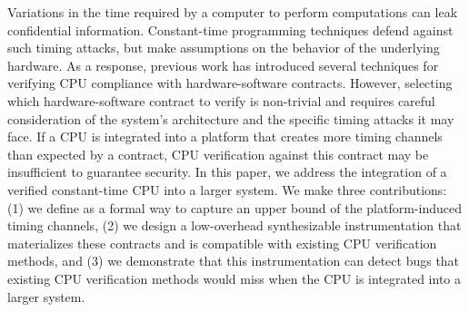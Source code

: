 Variations in the time required by a computer to perform computations can leak confidential information.
Constant-time programming techniques defend against such timing attacks, but make assumptions on the behavior of the underlying hardware.
As a response, previous work has introduced several techniques for verifying CPU compliance with hardware-software contracts.
%
However, selecting which hardware-software contract to verify is non-trivial and requires careful consideration of the system's architecture and the specific timing attacks it may face.
If a CPU is integrated into a platform that creates more timing channels than expected by a contract, CPU verification against this contract may be insufficient to guarantee security.
In this paper, we address the integration of a verified constant-time CPU into a larger system.
We make three contributions: (1) we define \pics as a formal way to capture an upper bound of the platform-induced timing channels, (2) we design a low-overhead synthesizable instrumentation that materializes these contracts and is compatible with existing CPU verification methods, and (3) we demonstrate that this instrumentation can detect bugs that existing CPU verification methods would miss when the CPU is integrated into a larger system.

